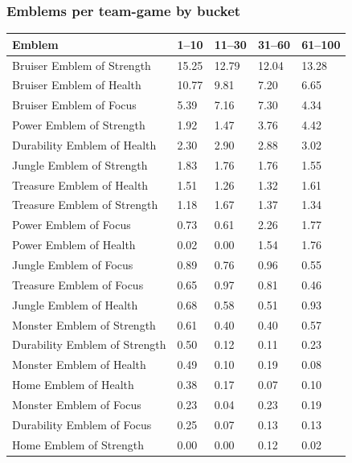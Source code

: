 \documentclass[
  10pt,
]{article}
\newcounter{none} %
\begin{document}
\subsubsection{Emblems per team-game by
bucket}\label{emblems-per-team-game-by-bucket}

{\def\LTcaptype{none} %
\begin{longtable}[]{@{}lllll@{}}
\toprule\noalign{}
Emblem & 1--10 & 11--30 & 31--60 & 61--100 \\
\midrule\noalign{}
\endhead
\bottomrule\noalign{}
\endlastfoot
Bruiser Emblem of Strength & 15.25 & 12.79 & 12.04 & 13.28 \\
Bruiser Emblem of Health & 10.77 & 9.81 & 7.20 & 6.65 \\
Bruiser Emblem of Focus & 5.39 & 7.16 & 7.30 & 4.34 \\
Power Emblem of Strength & 1.92 & 1.47 & 3.76 & 4.42 \\
Durability Emblem of Health & 2.30 & 2.90 & 2.88 & 3.02 \\
Jungle Emblem of Strength & 1.83 & 1.76 & 1.76 & 1.55 \\
Treasure Emblem of Health & 1.51 & 1.26 & 1.32 & 1.61 \\
Treasure Emblem of Strength & 1.18 & 1.67 & 1.37 & 1.34 \\
Power Emblem of Focus & 0.73 & 0.61 & 2.26 & 1.77 \\
Power Emblem of Health & 0.02 & 0.00 & 1.54 & 1.76 \\
Jungle Emblem of Focus & 0.89 & 0.76 & 0.96 & 0.55 \\
Treasure Emblem of Focus & 0.65 & 0.97 & 0.81 & 0.46 \\
Jungle Emblem of Health & 0.68 & 0.58 & 0.51 & 0.93 \\
Monster Emblem of Strength & 0.61 & 0.40 & 0.40 & 0.57 \\
Durability Emblem of Strength & 0.50 & 0.12 & 0.11 & 0.23 \\
Monster Emblem of Health & 0.49 & 0.10 & 0.19 & 0.08 \\
Home Emblem of Health & 0.38 & 0.17 & 0.07 & 0.10 \\
Monster Emblem of Focus & 0.23 & 0.04 & 0.23 & 0.19 \\
Durability Emblem of Focus & 0.25 & 0.07 & 0.13 & 0.13 \\
Home Emblem of Strength & 0.00 & 0.00 & 0.12 & 0.02 \\
\end{longtable}
}
\end{document}
